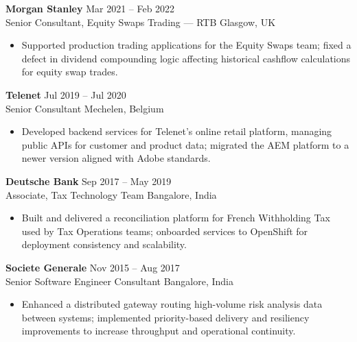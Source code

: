 \documentclass[a4paper,9pt]{article}
\begin{document}
\textbf{Morgan Stanley} \hfill Mar 2021 -- Feb 2022 \\
Senior Consultant, Equity Swaps Trading — RTB \hfill Glasgow, UK \vspace{-5pt}\\
\begin{itemize}[left=0pt, label=\textbullet, itemsep=0pt, parsep=0pt, topsep=0pt, partopsep=0pt]
    \item Supported production trading applications for the Equity Swaps team; fixed a defect in dividend compounding logic affecting historical cashflow calculations for equity swap trades.
\end{itemize}
\vspace{3pt}

\textbf{Telenet} \hfill Jul 2019 -- Jul 2020\\
Senior Consultant \hfill Mechelen, Belgium \vspace{-5pt}\\
\begin{itemize}[left=0pt, label=\textbullet, itemsep=0pt, parsep=0pt, topsep=0pt, partopsep=0pt]
    \item Developed backend services for Telenet's online retail platform, managing public APIs for customer and product data; migrated the AEM platform to a newer version aligned with Adobe standards.
\end{itemize}
\vspace{3pt}

\textbf{Deutsche Bank} \hfill Sep 2017 -- May 2019 \\
Associate, Tax Technology Team \hfill Bangalore, India \vspace{-5pt}\\
\begin{itemize}[left=0pt, label=\textbullet, itemsep=0pt, parsep=0pt, topsep=0pt, partopsep=0pt]
    \item Built and delivered a reconciliation platform for French Withholding Tax used by Tax Operations teams; onboarded services to OpenShift for deployment consistency and scalability.
\end{itemize}
\vspace{3pt}

\textbf{Societe Generale} \hfill Nov 2015 -- Aug 2017 \\
Senior Software Engineer Consultant \hfill Bangalore, India \vspace{-5pt}\\
\begin{itemize}[left=0pt, label=\textbullet, itemsep=0pt, parsep=0pt, topsep=0pt, partopsep=0pt]
    \item Enhanced a distributed gateway routing high-volume risk analysis data between systems; implemented priority-based delivery and resiliency improvements to increase throughput and operational continuity.
\end{itemize}
\vspace{3pt}
\end{document}
